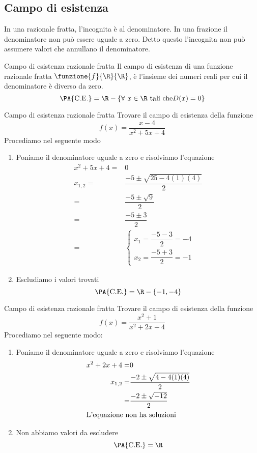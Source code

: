 \subsection{Campo di esistenza}
In una razionale fratta, l'incognita è al denominatore. In una frazione il denominatore non può essere uguale a zero. Detto questo l'incognita non può assumere valori che annullano il denominatore.
\begin{definizionet}{Campo di esistenza razionale fratta}{}
	Il campo di esistenza  di una funzione razionale fratta $\funzione{f}{\R}{\R}$, è  l'insieme dei numeri reali per cui il denominatore è diverso da zero.
	\[\text{\PA{C.E.}}=\R-\lbrace\forall\ x\in\R\ \text{tali che} D(x)= 0\rbrace\]
\end{definizionet}
\begin{esempiot}{Campo di esistenza razionale fratta}{}
	Trovare il campo di esistenza della funzione\[f(x)=\dfrac{x-4}{x^2+5x+4}\]
	Procediamo nel  seguente modo
	\begin{enumerate}
		\item Poniamo il denominatore uguale a zero e risolviamo l'equazione\begin{align*}
		x^2+5x+4=&0\\
		x_{1,2}=&\dfrac{-5\pm\sqrt{25-4(1)(4)}}{2}\\
		=&\dfrac{-5\pm\sqrt{9}}{2}\\
		=&\dfrac{-5\pm 3}{2}\\
		=&\begin{cases}
		x_1=\dfrac{-5-3}{2}=-4\\
		x_2=\dfrac{-5+3}{2}=-1
		\end{cases}
		\end{align*}
		\item Escludiamo i valori trovati\[\text{\PA{C.E.}}=\R-\lbrace -1,-4\rbrace\]
	\end{enumerate}
\end{esempiot}
\begin{esempiot}{Campo di esistenza razionale fratta}{}
	Trovare il campo di esistenza della funzione\[f(x)=\dfrac{x^2+1}{x^2+2x+4}\]
	Procediamo nel  seguente modo:
	\begin{enumerate}
		\item Poniamo il denominatore uguale a zero e risolviamo l'equazione\begin{align*}
		x^2+2x+4=&0\\
		x_{1,2}=&\dfrac{-2\pm\sqrt{4-4(1)(4)}}{2}\\
		=&\dfrac{-2\pm\sqrt{-12}}{2}\\
	\intertext{L'equazione non ha soluzioni}
		\end{align*}
		\item Non abbiamo valori da escludere\[\text{\PA{C.E.}}=\R\]
	\end{enumerate}
\end{esempiot}

